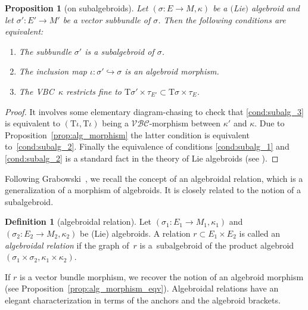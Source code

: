 \documentclass[10pt,a4paper]{amsart}
\newcommand{\ZM}{{VBC}} %
\newcommand{\ra}{\rightarrow}
\newcommand{\T}{\mathrm{T}} %
\newcommand{\catZM}{{\mathcal{VBC}}} %
\numberwithin{equation}{section}
\newtheorem{prop}[thm]{Proposition}
\theoremstyle{definition}
\newtheorem{df}[thm]{Definition}
\begin{document}
\begin{prop}[on subalgebroids]\label{p:subalgebroid} Let $(\sigma\colon\! E\!\ra\! M, \kappa)$ be a $($Lie$)$ algebroid and let \mbox{$\sigma'\colon\! E'\!\ra\! M'$} be a vector subbundle of $\sigma$. Then the following conditions are equivalent:
\begin{enumerate}[$(i)$]\itemsep=0pt
	\item\label{cond:subalg_1} The subbundle $\sigma'$ is a subalgebroid of $\sigma$.
	\item\label{cond:subalg_2} The inclusion map $\iota\colon \sigma'\hookrightarrow\sigma$ is an algebroid morphism.
	\item\label{cond:subalg_3} The \ZM\ $\kappa$ restricts fine to $\T\sigma'\times\tau_{E'}\subset \T\sigma\times\tau_{E}$.
\end{enumerate}
\end{prop}
\begin{proof}It involves some elementary diagram-chasing to check that \eqref{cond:subalg_3} is equivalent to $(\T\iota,\T\iota)$ being a $\catZM$-morphism between $\kappa'$ and $\kappa$. Due to Proposition~\ref{prop:alg_morphism} the latter condition is equivalent to~\eqref{cond:subalg_2}. Finally the equivalence of conditions \eqref{cond:subalg_1} and \eqref{cond:subalg_2} is a standard fact in the theory of Lie algebroids (see \cite[Chapter~4]{Mackenzie_lie_2005}).
\end{proof}

Following Grabowski~\cite{JG_mod_class_skew_alg_rel_2012}, we recall the concept of an algebroidal relation, which is a generalization of a morphism of algebroids. It is closely related to the notion of a subalgebroid.

\begin{df}[algebroidal relation]\label{df:alg_relation} Let $(\sigma_1\colon E_1\ra M_1,\kappa_1)$ and $(\sigma_2\colon E_2\ra M_2,\kappa_2)$ be (Lie) algebroids. A relation $r\subset E_1 \times E_2$ is called an \emph{algebroidal relation} if the graph of~$r$ is a~subalgebroid of the product algebroid $(\sigma_1\times \sigma_2,\kappa_1\times\kappa_2)$.
\end{df}
If $r$ is a vector bundle morphism, we recover the notion of an algebroid morphism (see Proposition~\ref{prop:alg_morphism_eqv}). Algebroidal relations have an elegant characterization in terms of the anchors and the algebroid brackets.
\end{document}
